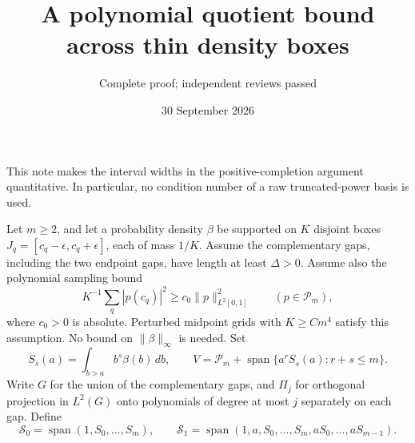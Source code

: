 \documentclass[11pt]{article}
\title{A polynomial quotient bound across thin density boxes}
\author{Complete proof; independent reviews passed}\date{30 September 2026}
\newcommand{\PP}{\mathcal P}
\begin{document}
\maketitle
This note makes the interval widths in the positive-completion argument
quantitative. In particular, no condition number of a raw truncated-power
basis is used.

Let $m\ge2$, and let a probability density $\beta$ be supported on $K$
disjoint boxes $J_q=[c_q-\epsilon,c_q+\epsilon]$, each of mass $1/K$.
Assume the complementary gaps, including the two endpoint gaps, have
length at least $\Delta>0$. Assume also the polynomial sampling bound
\begin{equation}\label{sampling}
 K^{-1}\sum_q |p(c_q)|^2\ge c_0\|p\|_{L^2[0,1]}^2
 \qquad(p\in\PP_m),
\end{equation}
where $c_0>0$ is absolute. Perturbed midpoint grids with $K\ge Cm^4$
satisfy this assumption. No bound on $\|\beta\|_\infty$ is needed.
Set
\[
 S_s(a)=\int_{b>a}b^s\beta(b)\,db,\qquad
 V=\PP_m+\operatorname{span}\{a^rS_s(a):r+s\le m\}.
\]
Write $G$ for the union of the complementary gaps, and $\Pi_j$ for
orthogonal projection in $L^2(G)$ onto polynomials of degree at most $j$
separately on each gap. Define
\[
 \mathcal S_0=\operatorname{span}(1,S_0,\ldots,S_m),\qquad
 \mathcal S_1=\operatorname{span}(1,a,S_0,\ldots,S_m,
                                  aS_0,\ldots,aS_{m-1}).
\]
\end{document}
